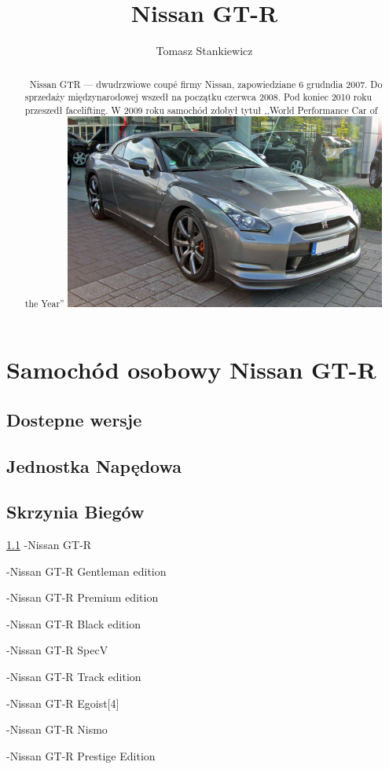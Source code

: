 \documentclass[a4paper,12pt]{article}
\title{Nissan GT-R}
\author{Tomasz Stankiewicz}
\begin{document}
\maketitle

\begin{abstract}
~Nissan GTR --- dwudrzwiowe coupé firmy Nissan, zapowiedziane 6 grudndia 2007. Do sprzedaży międzynarodowej wszedł na początku czerwca 2008. Pod koniec 2010 roku przeszedł facelifting. W 2009 roku samochód zdobył tytuł ,,World Performance Car of the Year''
 \centering
\includegraphics{Nissan.jpg}
\end{abstract}
\section{Samochód osobowy Nissan GT-R}
\subsection{Dostepne wersje}
\label{Dostepne Wersje}
\subsection{Jednostka Napędowa}
\label{Jednoska Napedowa}
\subsection{Skrzynia Biegów}
\label{Skrzynia Biegów}
\begin{table}
\ref{Dostepne Wersje}
-Nissan GT-R

-Nissan GT-R Gentleman edition


-Nissan GT-R Premium edition


-Nissan GT-R Black edition

-Nissan GT-R SpecV

-Nissan GT-R Track edition

-Nissan GT-R Egoist[4]

-Nissan GT-R Nismo

-Nissan GT-R Prestige Edition


\end{table}
\end{document}
